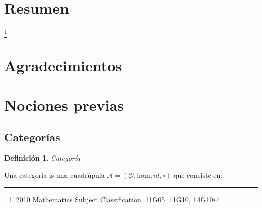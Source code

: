 \documentclass[11pt,a4paper,openright,oneside]{article}
\numberwithin{equation}{section}
\newtheorem{defi}[teo]{Definici\'on}
\theoremstyle{definition}
\begin{document}


\section*{Resumen}
 {\let\thefootnote\relax\footnote{2010 Mathematics Subject Classification. 11G05, 11G10, 14G10}}
\newpage


\section*{Agradecimientos}
\newpage


\tableofcontents
\newpage



\setcounter{page}{1}

\section{Nociones previas}
\subsection{Categor\'ias}
\begin{defi}
    Categor\'ia
\end{defi}
Una categor\'ia is una cuadr\'upula $\mathcal{A} = (\mathcal{O}, \text{hom}, \mathit{id}, \circ)$ que consiste en:
\end{document}
